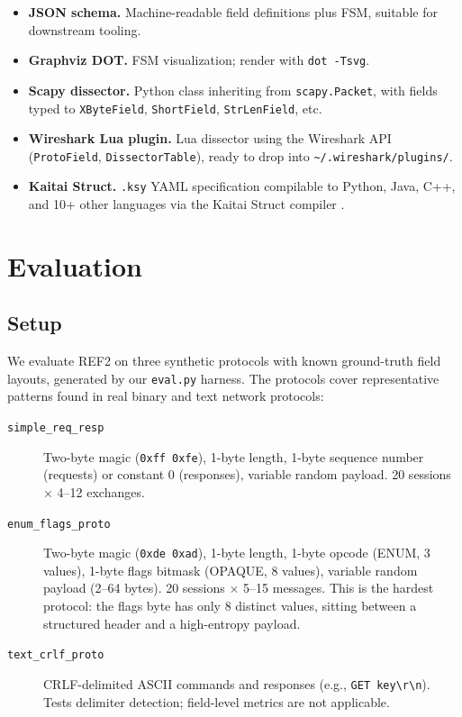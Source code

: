 \documentclass[letterpaper,twocolumn,10pt]{article}
\begin{document}
\begin{itemize}
  \item \textbf{JSON schema.}  Machine-readable field definitions plus FSM,
    suitable for downstream tooling.
  \item \textbf{Graphviz DOT.}  FSM visualization; render with
    \texttt{dot -Tsvg}.
  \item \textbf{Scapy dissector.}  Python class inheriting from
    \texttt{scapy.Packet}, with fields typed to \texttt{XByteField},
    \texttt{ShortField}, \texttt{StrLenField}, etc.
  \item \textbf{Wireshark Lua plugin.}  Lua dissector using the Wireshark API
    (\texttt{ProtoField}, \texttt{DissectorTable}), ready to drop into
    \texttt{\textasciitilde/.wireshark/plugins/}.
  \item \textbf{Kaitai Struct.}  \texttt{.ksy} YAML specification compilable
    to Python, Java, C++, and 10+ other languages via the Kaitai Struct
    compiler \cite{kaitai}.
\end{itemize}

\section{Evaluation}
\label{sec:eval}

\subsection{Setup}

We evaluate \textsc{REF2} on three synthetic protocols with known ground-truth
field layouts, generated by our \texttt{eval.py} harness.  The protocols cover
representative patterns found in real binary and text network protocols:

\begin{description}
  \item[\texttt{simple\_req\_resp}]
    Two-byte magic (\texttt{0xff\,0xfe}), 1-byte length, 1-byte
    sequence number (requests) or constant 0 (responses), variable random
    payload.  20 sessions $\times$ 4--12 exchanges.

  \item[\texttt{enum\_flags\_proto}]
    Two-byte magic (\texttt{0xde\,0xad}), 1-byte length, 1-byte opcode (ENUM,
    3 values), 1-byte flags bitmask (OPAQUE, 8 values), variable random
    payload (2--64 bytes).  20 sessions $\times$ 5--15 messages.  This is the
    hardest protocol: the flags byte has only 8 distinct values, sitting between
    a structured header and a high-entropy payload.

  \item[\texttt{text\_crlf\_proto}]
    CRLF-delimited ASCII commands and responses (e.g., \texttt{GET key\textbackslash r\textbackslash n}).
    Tests delimiter detection; field-level metrics are not applicable.
\end{description}
\end{document}

